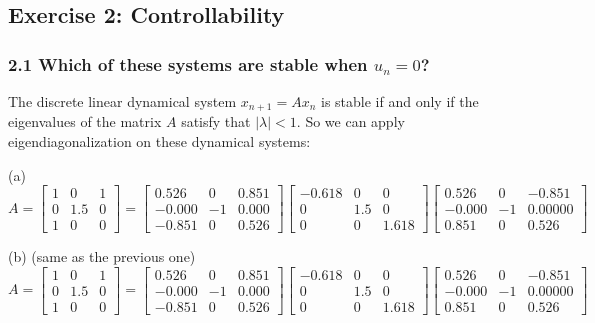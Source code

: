 \subsection*{Exercise 2: Controllability}

\subsubsection*{2.1 Which of these systems are stable when \( u_n = 0 \)?}

The discrete linear dynamical system \( x_{n+1} = Ax_n \) is stable if and only if the eigenvalues of the matrix \( A \) satisfy that \( | \lambda | < 1 \). So we can apply eigendiagonalization on these dynamical systems:

\quad (a)
\[
    A =
        \begin{bmatrix}
            1 & 0   & 1 \\
            0 & 1.5 & 0 \\
            1 & 0   & 0
        \end{bmatrix}
    =
        \begin{bmatrix}
            0.526  & 0  & 0.851 \\
            -0.000 & -1 & 0.000 \\
            -0.851 & 0  & 0.526
        \end{bmatrix}
        \begin{bmatrix}
            -0.618 & 0       & 0 \\
            0        & 1.5 & 0 \\
            0        & 0       & 1.618
        \end{bmatrix}
        \begin{bmatrix}
            0.526  & 0  & -0.851 \\
            -0.000 & -1 & 0.00000 \\
            0.851  & 0  & 0.526
        \end{bmatrix}
\]

\quad (b) (same as the previous one)
\[
    A =
        \begin{bmatrix}
            1 & 0   & 1 \\
            0 & 1.5 & 0 \\
            1 & 0   & 0
        \end{bmatrix}
    =
        \begin{bmatrix}
            0.526  & 0  & 0.851 \\
            -0.000 & -1 & 0.000 \\
            -0.851 & 0  & 0.526
        \end{bmatrix}
        \begin{bmatrix}
            -0.618 & 0       & 0 \\
            0        & 1.5 & 0 \\
            0        & 0       & 1.618
        \end{bmatrix}
        \begin{bmatrix}
            0.526  & 0  & -0.851 \\
            -0.000 & -1 & 0.00000 \\
            0.851  & 0  & 0.526
        \end{bmatrix}
\]

